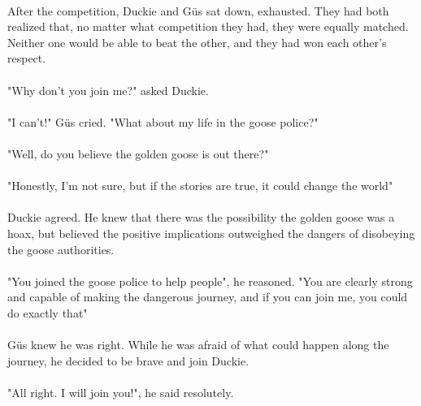 \paragraph{} After the competition, Duckie and Güs sat down, exhausted. They had both realized that, no matter what competition they had, they were equally matched. Neither one would be able to beat the other, and they had won each other's respect. 
\paragraph{} "Why don't you join me?" asked Duckie.
\paragraph{} "I can't!" Güs cried. "What about my life in the goose police?"
\paragraph{} "Well, do you believe the golden goose is out there?"
\paragraph{} "Honestly, I'm not sure, but if the stories are true, it could change the world"
\paragraph{} Duckie agreed. He knew that there was the possibility the golden goose was a hoax, but believed the positive implications outweighed the dangers of disobeying the goose authorities. 
\paragraph{} "You joined the goose police to help people", he reasoned. "You are clearly strong and capable of making the dangerous journey, and if you can join me, you could do exactly that"
\paragraph{} Güs knew he was right. While he was afraid of what could happen along the journey, he decided to be brave and join Duckie. 
\paragraph{} "All right. I will join you!", he said resolutely. 